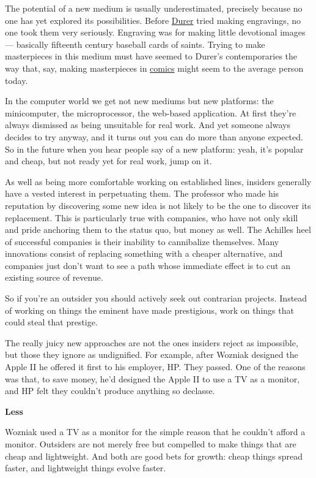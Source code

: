 The potential of a new medium is usually underestimated, precisely
because no one has yet explored its possibilities. Before
\href{pilate.html}{Durer} tried making engravings, no one took them very
seriously. Engraving was for making little devotional images ---
basically fifteenth century baseball cards of saints. Trying to make
masterpieces in this medium must have seemed to Durer's contemporaries
the way that, say, making masterpieces in
\href{http://www.fantagraphics.com/artist/clowes/clowes.html}{comics}
might seem to the average person today.

In the computer world we get not new mediums but new platforms: the
minicomputer, the microprocessor, the web-based application. At first
they're always dismissed as being unsuitable for real work. And yet
someone always decides to try anyway, and it turns out you can do more
than anyone expected. So in the future when you hear people say of a new
platform: yeah, it's popular and cheap, but not ready yet for real work,
jump on it.

As well as being more comfortable working on established lines, insiders
generally have a vested interest in perpetuating them. The professor who
made his reputation by discovering some new idea is not likely to be the
one to discover its replacement. This is particularly true with
companies, who have not only skill and pride anchoring them to the
status quo, but money as well. The Achilles heel of successful companies
is their inability to cannibalize themselves. Many innovations consist
of replacing something with a cheaper alternative, and companies just
don't want to see a path whose immediate effect is to cut an existing
source of revenue.

So if you're an outsider you should actively seek out contrarian
projects. Instead of working on things the eminent have made
prestigious, work on things that could steal that prestige.

The really juicy new approaches are not the ones insiders reject as
impossible, but those they ignore as undignified. For example, after
Wozniak designed the Apple II he offered it first to his employer, HP.
They passed. One of the reasons was that, to save money, he'd designed
the Apple II to use a TV as a monitor, and HP felt they couldn't produce
anything so declasse.

\textbf{Less}

Wozniak used a TV as a monitor for the simple reason that he couldn't
afford a monitor. Outsiders are not merely free but compelled to make
things that are cheap and lightweight. And both are good bets for
growth: cheap things spread faster, and lightweight things evolve
faster.

